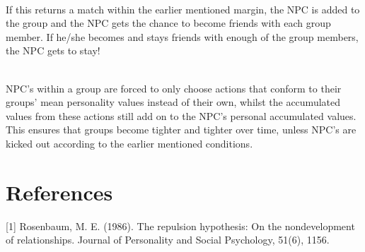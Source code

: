 \documentclass[11pt]{article} %
\begin{document}
~\\
 If this returns a match within the earlier mentioned margin, the NPC is added to the group and the NPC gets the chance to become friends with each group member. If he/she becomes and stays friends with enough of the group members, the NPC gets to stay!

~\\
NPC's within a group are forced to only choose actions that conform to their groups' mean personality values instead of their own, whilst the accumulated values from these actions still add on to the NPC's personal accumulated values. This ensures that groups become tighter and tighter over time, unless NPC's are kicked out according to the earlier mentioned conditions.

\newpage
\section{References}
[1] Rosenbaum, M. E. (1986). The repulsion hypothesis: On the nondevelopment of relationships. Journal of Personality and Social Psychology, 51(6), 1156.




\end{document}
